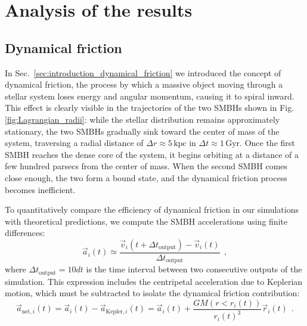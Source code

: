 \documentclass[fleqn,usenatbib]{mnras}
\begin{document}
\section{Analysis of the results}\label{sec:analysis}
\subsection{Dynamical friction}\label{sec:analysis_dynamical_friction}
In Sec.~\ref{sec:introduction_dynamical_friction} we introduced the concept of dynamical friction, the process by which a massive object moving through a stellar system loses energy and angular momentum, causing it to spiral inward.
This effect is clearly visible in the trajectories of the two SMBHs shown in Fig. \ref{fig:Lagrangian_radii}: while the stellar distribution remains approximately stationary, the two SMBHs gradually sink toward the center of mass of the system, traversing a radial distance of $\Delta r \approx 5 \,\text{kpc}$ in $\Delta t \approx 1 \,\text{Gyr}$.
Once the first SMBH reaches the dense core of the system, it begins orbiting at a distance of a few hundred parsecs from the center of mass.
When the second SMBH comes close enough, the two form a bound state, and the dynamical friction process becomes inefficient.
\vspace{0.5em}

To quantitatively compare the efficiency of dynamical friction in our simulations with theoretical predictions, we compute the SMBH accelerations using finite differences:
\begin{equation}
    \vec{a}_i(t) \simeq \dfrac{\vec{v}_i(t+\Delta t_\text{output}) - \vec{v}_i(t)}{\Delta t_\text{output}} \:\: ,
    \label{eq:acceleration}
\end{equation}
where $\Delta t_\text{output} = 10 dt$ is the time interval between two consecutive outputs of the simulation.
This expression includes the centripetal acceleration due to Keplerian motion, which must be subtracted to isolate the dynamical friction contribution:
\begin{equation}
    \vec{a}_{\text{net},i}(t) = \vec{a}_i(t) - \vec{a}_{\text{Kepler},i}(t)
    = \vec{a}_i(t) + \dfrac{GM\left(r<r_i(t)\right)}{r_i(t)^3} \vec{r}_i(t) \:\: .
    \label{eq:acceleration_dynamical_friction}
\end{equation}
\vspace{0.5em}
\end{document}
